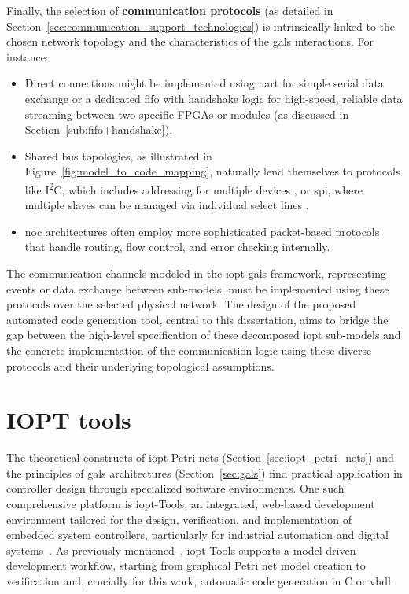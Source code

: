 Finally, the selection of \textbf{communication protocols} (as detailed in Section~\ref{sec:communication_support_technologies}) is intrinsically linked to the chosen network topology and the characteristics of the \gls{gals} interactions. For instance:
\begin{itemize}
    \item Direct connections might be implemented using \gls{uart} for simple serial data exchange \cite{UARTwiki, Rao2021} or a dedicated \gls{fifo} with handshake logic for high-speed, reliable data streaming between two specific FPGAs or modules (as discussed in Section~\ref{sub:fifo+handshake}).
    \item Shared bus topologies, as illustrated in Figure~\ref{fig:model_to_code_mapping}, naturally lend themselves to protocols like I\textsuperscript{2}C, which includes addressing for multiple devices \cite{i2c,I2Cv2}, or \gls{spi}, where multiple slaves can be managed via individual select lines \cite{spisite, spisite2}.
    \item \gls{noc} architectures often employ more sophisticated packet-based protocols that handle routing, flow control, and error checking internally.
\end{itemize}
The communication channels modeled in the \gls{iopt} \gls{gals} framework, representing events or data exchange between sub-models, must be implemented using these protocols over the selected physical network. The design of the proposed automated code generation tool, central to this dissertation, aims to bridge the gap between the high-level specification of these decomposed \gls{iopt} sub-models and the concrete implementation of the communication logic using these diverse protocols and their underlying topological assumptions.








\section{IOPT tools}
\label{sec:iopt_tools}



The theoretical constructs of \gls{iopt} Petri nets (Section~\ref{sec:iopt_petri_nets}) and the principles of \gls{gals} architectures (Section~\ref{sec:gals}) find practical application in controller design through specialized software environments. One such comprehensive platform is \gls{iopt}-Tools, an integrated, web-based development environment tailored for the design, verification, and implementation of embedded system controllers, particularly for industrial automation and digital systems~\cite{iopttools}. As previously mentioned~\cite{iopttools}, \gls{iopt}-Tools supports a model-driven development workflow, starting from graphical Petri net model creation to verification and, crucially for this work, automatic code generation in C or \gls{vhdl}.

